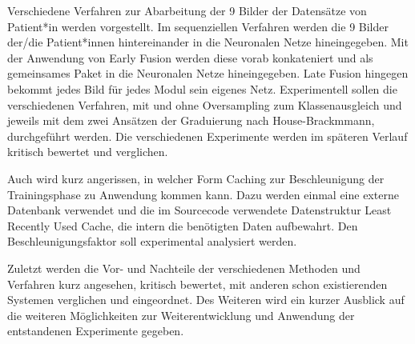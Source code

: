 Verschiedene Verfahren zur Abarbeitung der 9 Bilder der Datensätze von Patient*in werden vorgestellt. Im sequenziellen Verfahren werden die 9 Bilder der/die Patient*innen hintereinander in die Neuronalen Netze hineingegeben. Mit der Anwendung von Early Fusion werden diese vorab konkateniert und als gemeinsames Paket in die Neuronalen Netze hineingegeben. Late Fusion hingegen bekommt jedes Bild für jedes Modul sein eigenes Netz. Experimentell sollen die verschiedenen Verfahren, mit und ohne Oversampling zum Klassenausgleich und jeweils mit dem zwei Ansätzen der Graduierung nach House-Brackmmann, durchgeführt werden. Die verschiedenen Experimente werden im späteren Verlauf kritisch bewertet und verglichen.

Auch wird kurz angerissen, in welcher Form Caching zur Beschleunigung der Trainingsphase zu Anwendung kommen kann. Dazu werden einmal eine externe Datenbank verwendet und die im Sourcecode verwendete Datenstruktur Least Recently Used Cache, die intern die benötigten Daten aufbewahrt. Den Beschleunigungsfaktor soll experimental analysiert werden.

Zuletzt werden die Vor- und Nachteile der verschiedenen Methoden und Verfahren kurz angesehen, kritisch bewertet, mit anderen schon existierenden Systemen verglichen und eingeordnet. Des Weiteren wird ein kurzer Ausblick auf die weiteren Möglichkeiten zur Weiterentwicklung und Anwendung der entstandenen Experimente gegeben.
